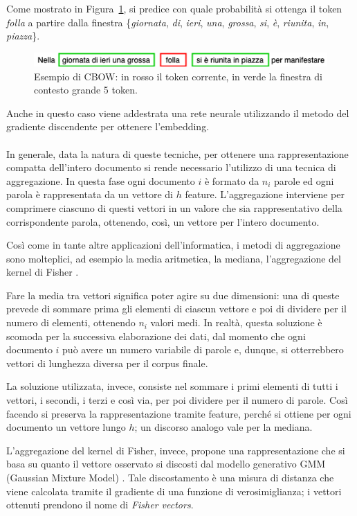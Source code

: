 \documentclass[12pt]{report}
\theoremstyle{definition}
\begin{document}
Come mostrato in Figura~\ref{cbow}, si predice con quale probabilità si ottenga il token \textit{folla} a partire dalla finestra \{\textit{giornata}, \textit{di}, \textit{ieri}, \textit{una}, \textit{grossa}, \textit{si}, \textit{è}, \textit{riunita}, \textit{in}, \textit{piazza}\}.
\begin{figure}
    \centering
    \includegraphics[scale = 0.7]{images/cbow.png}
    \caption{Esempio di CBOW: in rosso il token corrente, in verde la finestra di contesto grande 5 token.}
    \label{cbow}
\end{figure}
Anche in questo caso viene addestrata una rete neurale utilizzando il metodo del gradiente discendente per ottenere l'embedding.
\\
\\
In generale, data la natura di queste tecniche, per ottenere una rappresentazione compatta dell'intero documento si rende necessario l'utilizzo di una tecnica di aggregazione.
In questa fase ogni documento $i$ è formato da $n_i$ parole ed ogni parola è rappresentata da un vettore di $h$ feature. L'aggregazione interviene per comprimere ciascuno di questi vettori in un valore che sia rappresentativo della corrispondente parola, ottenendo, così, un vettore per l'intero documento.

Così come in tante altre applicazioni dell'informatica, i metodi di aggregazione sono molteplici, ad esempio la media aritmetica, la mediana, l'aggregazione del kernel di Fisher \cite{19}.

Fare la media tra vettori significa poter agire su due dimensioni: una di queste prevede di sommare prima gli elementi di ciascun vettore e poi di dividere per il numero di elementi, ottenendo $n_i$ valori medi. In realtà, questa soluzione è scomoda per la successiva elaborazione dei dati, dal momento che ogni documento $i$ può avere un numero variabile di parole e, dunque, si otterrebbero vettori di lunghezza diversa per il corpus finale.

La soluzione utilizzata, invece, consiste nel sommare i primi elementi di tutti i vettori, i secondi, i terzi e così via, per poi dividere per il numero di parole. Così facendo si preserva la rappresentazione tramite feature, perché si ottiene per ogni documento un vettore lungo $h$; un discorso analogo vale per la mediana.

L'aggregazione del kernel di Fisher, invece, propone una rappresentazione che si basa su quanto il vettore osservato si discosti dal modello generativo GMM (Gaussian Mixture Model) \cite{37}. Tale discostamento è una misura di distanza che viene calcolata tramite il gradiente di una funzione di verosimiglianza; i vettori ottenuti prendono il nome di \textit{Fisher vectors}.
\end{document}
